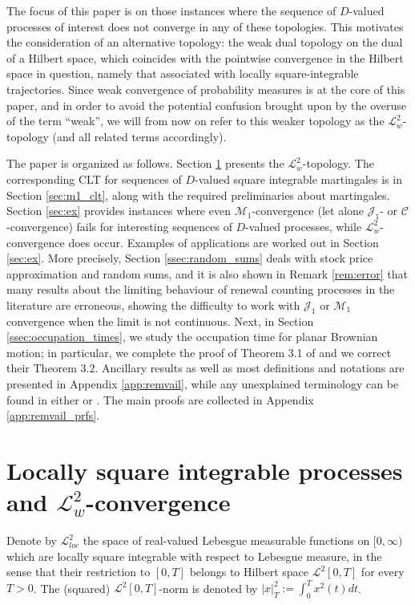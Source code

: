 \documentclass[final]{amsart}
\theoremstyle{definition}
\numberwithin{equation}{section}
\newcommand{\cJ}{\ensuremath{\mathcal{J}}}
\newcommand{\cL}{\ensuremath{\mathcal{L}}}
\newcommand{\cM}{\ensuremath{\mathcal{M}}}
\begin{document}
The focus of this paper is on those instances where the sequence
of $D$-valued processes of interest does not converge in any of these topologies.
This motivates the consideration of an alternative topology: the weak dual topology
on the dual of a Hilbert space, which coincides with the pointwise convergence in the Hilbert space in question,
namely that associated with locally square-integrable trajectories.
Since weak convergence of probability measures is at the core of this paper,
and in order to avoid the potential confusion brought upon by the overuse of the term ``weak'',
we will from now on refer to this weaker topology as the $\cL^2_w$-topology (and all related terms accordingly).

The paper is organized as follows. Section \ref{sec:ell_two} presents the $\cL^2_w$-topology.
The corresponding CLT for sequences of $D$-valued square integrable martingales is in Section \ref{sec:m1_clt}, along with the required preliminaries about martingales.
Section \ref{sec:ex} provides instances where even
$\mathcal{M}_1$-convergence (let alone $\mathcal{J}_1$- or $\mathcal{C}$-convergence) fails for interesting
sequences of $D$-valued processes, while $\cL^2_w$-convergence does occur.
Examples of applications are worked out in Section \ref{sec:ex}. More precisely, Section \ref{ssec:random_sums}  deals with stock price approximation and random sums, and it is also shown in Remark \ref{rem:error} that many results about the limiting behaviour of renewal counting processes in the literature are erroneous, showing the difficulty to work with $\cJ_1$ or $\cM_1$ convergence when the limit is not continuous. Next, in Section \ref{ssec:occupation_times}, we study the  occupation time for planar Brownian motion; in particular, we complete the proof of Theorem 3.1 of  \citet{Kasahara/Kotani:1979} and we correct their Theorem 3.2.
Ancillary results as well as most definitions and notations are presented in Appendix \ref{app:remvail},
while any unexplained terminology can be found in either \citet{Ethier/Kurtz:1986} or \citet{Jacod/Shiryaev:2003}.
The main proofs are collected in Appendix \ref{app:remvail_prfs}.


\section{Locally square integrable processes and $\cL^2_w$-convergence}\label{sec:ell_two}
Denote by $\cL^2_{loc}$ the space of real-valued Lebesgue measurable functions on $[0,\infty)$ which are
locally square integrable with respect to Lebesgue measure, in the sense that their restriction to $[0,T]$ belongs to
Hilbert space $\cL^2[0,T]$ for every $T>0$.
The (squared) $\cL^2[0,T]$-norm is denoted by $|x|_T^2:=\int_0^Tx^2(t)dt$.
\end{document}
